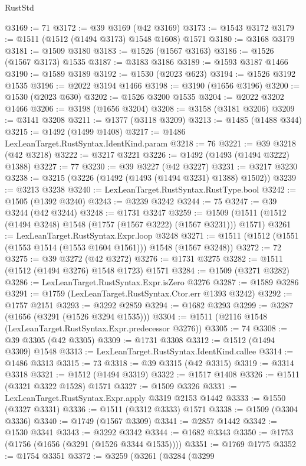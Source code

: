 \begin{lexlean}{RustStd}
\begin{coremodule}
{{@3169 := 71
@3172 := @39 @3169 (@42 @3169)
@3173 := @1543 @3172
@3179 := @1511 (@1512 (@1494 @3173) @1548 @1608) @1571
@3180 := @3168 @3179
@3181 := @1509 @3180
@3183 := @1526 (@1567 @3163)
@3186 := @1526 (@1567 @3173) @1535
@3187 := @3183 @3186
@3189 := @1593 @3187 @1466
@3190 := @1589 @3189
@3192 := @1530 (@2023 @623)
@3194 := @1526 @3192 @1535
@3196 := @2022 @3194 @1466
@3198 := @3190 (@1656 @3196)
@3200 := @1530 (@2023 @630)
@3202 := @1526 @3200 @1535
@3204 := @2022 @3202 @1466
@3206 := @3198 (@1656 @3204)
@3208 := @3158 (@3181 @3206)
@3209 := @3141 @3208
@3211 := @1377 (@3118 @3209)
@3213 := @1485 (@1488 @344)
@3215 := @1492 (@1499 @1408)
@3217 := @1486 LexLeanTarget.RustSyntax.IdentKind.param
@3218 := 76
@3221 := @39 @3218 (@42 @3218)
@3222 := @3217 @3221
@3226 := @1492 (@1493 (@1494 @3222) @1388)
@3227 := 77
@3230 := @39 @3227 (@42 @3227)
@3231 := @3217 @3230
@3238 := @3215 (@3226 (@1492 (@1493 (@1494 @3231) @1388) @1502))
@3239 := @3213 @3238
@3240 := LexLeanTarget.RustSyntax.RustType.bool
@3242 := @1505 (@1392 @3240)
@3243 := @3239 @3242
@3244 := 75
@3247 := @39 @3244 (@42 @3244)
@3248 := @1731 @3247
@3259 := @1509 (@1511 (@1512 (@1494 @3248) @1548 (@1757 (@1567 @3222) (@1567 @3231))) @1571)
@3261 := LexLeanTarget.RustSyntax.Expr.loop @3248
@3271 := @1511 (@1512 (@1551 (@1553 @1514 (@1553 @1604 @1561))) @1548 (@1567 @3248))
@3272 := 72
@3275 := @39 @3272 (@42 @3272)
@3276 := @1731 @3275
@3282 := @1511 (@1512 (@1494 @3276) @1548 @1723) @1571
@3284 := @1509 (@3271 @3282)
@3286 := LexLeanTarget.RustSyntax.Expr.isZero @3276
@3287 := @1589 @3286
@3291 := @1759 (LexLeanTarget.RustSyntax.Ctor.err @1393 @3242)
@3292 := @1757 @2151
@3293 := @3292 @2859
@3294 := @1682 @3293
@3299 := @3287 (@1656 (@3291 (@1526 @3294 @1535)))
@3304 := @1511 (@2116 @1548 (LexLeanTarget.RustSyntax.Expr.predecessor @3276))
@3305 := 74
@3308 := @39 @3305 (@42 @3305)
@3309 := @1731 @3308
@3312 := @1512 (@1494 @3309) @1548
@3313 := LexLeanTarget.RustSyntax.IdentKind.callee
@3314 := @1486 @3313
@3315 := 73
@3318 := @39 @3315 (@42 @3315)
@3319 := @3314 @3318
@3321 := @1512 (@1494 @3319)
@3322 := @1517 @1408
@3326 := @1511 (@3321 @3322 @1528) @1571
@3327 := @1509 @3326
@3331 := LexLeanTarget.RustSyntax.Expr.apply @3319 @2153 @1442
@3333 := @1550 (@3327 @3331)
@3336 := @1511 (@3312 @3333) @1571
@3338 := @1509 (@3304 @3336)
@3340 := @1749 (@1567 @3309)
@3341 := @2857 @1442
@3342 := @1530 @3341
@3343 := @3292 @3342
@3344 := @1682 @3343
@3350 := @1753 (@1756 (@1656 (@3291 (@1526 @3344 @1535))))
@3351 := @1769 @1775
@3352 := @1754 @3351
@3372 := @3259
    (@3261
      (@3284
        (@3299
}}
\end{coremodule}
\end{lexlean}
